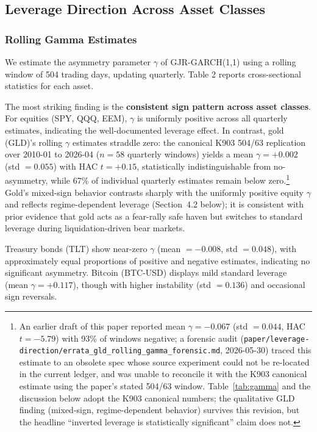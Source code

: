 \subsection{Leverage Direction Across Asset Classes}

\subsubsection{Rolling Gamma Estimates}

We estimate the asymmetry parameter $\gamma$ of GJR-GARCH(1,1) using a rolling window of 504 trading days, updating quarterly. Table 2 reports cross-sectional statistics for each asset.

The most striking finding is the \textbf{consistent sign pattern across asset classes}. For equities (SPY, QQQ, EEM), $\gamma$ is uniformly positive across all quarterly estimates, indicating the well-documented leverage effect. In contrast, gold (GLD)'s rolling $\gamma$ estimates straddle zero: the canonical K903 504/63 replication over 2010-01 to 2026-04 ($n = 58$ quarterly windows) yields a mean $\gamma = +0.002$ (std $= 0.055$) with HAC $t = +0.15$, statistically indistinguishable from no-asymmetry, while 67\% of individual quarterly estimates remain below zero.\footnote{An earlier draft of this paper reported mean $\gamma = -0.067$ (std $= 0.044$, HAC $t = -5.79$) with 93\% of windows negative; a forensic audit (\texttt{paper/leverage-direction/errata\_gld\_rolling\_gamma\_forensic.md}, 2026-05-30) traced this estimate to an obsolete spec whose source experiment could not be re-located in the current ledger, and was unable to reconcile it with the K903 canonical estimate using the paper's stated 504/63 window. Table~\ref{tab:gamma} and the discussion below adopt the K903 canonical numbers; the qualitative GLD finding (mixed-sign, regime-dependent behavior) survives this revision, but the headline ``inverted leverage is statistically significant'' claim does not.} Gold's mixed-sign behavior contrasts sharply with the uniformly positive equity $\gamma$ and reflects regime-dependent leverage (Section~4.2 below); it is consistent with prior evidence that gold acts as a fear-rally safe haven \citep{baur2010safe,baur2010hedge} but switches to standard leverage during liquidation-driven bear markets.

Treasury bonds (TLT) show near-zero $\gamma$ (mean $= -0.008$, std $= 0.048$), with approximately equal proportions of positive and negative estimates, indicating no significant asymmetry. Bitcoin (BTC-USD) displays mild standard leverage (mean $\gamma = +0.117$), though with higher instability (std $= 0.136$) and occasional sign reversals.

